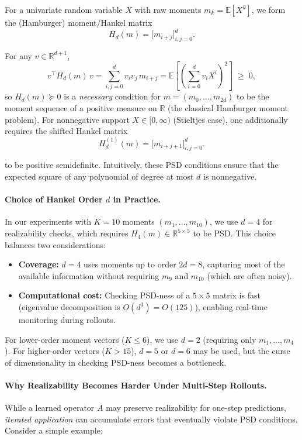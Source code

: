 \documentclass[journal, onecolumn]{IEEEtran}
\begin{document}
For a univariate random variable $X$ with raw moments \( m_k = \mathbb{E}[X^k] \), we form the (Hamburger) moment/Hankel matrix
\[
H_d(m) = \big[m_{i+j}\big]_{i,j=0}^d.
\]

For any \( v \in \mathbb{R}^{d+1} \),
\[
v^\top H_d(m)\, v
= \sum_{i,j=0}^d v_i v_j\, m_{i+j}
= \mathbb{E}\!\left[\left(\sum_{i=0}^d v_i X^i\right)^2\right]
\;\ge\; 0,
\]
so \( H_d(m) \succeq 0 \) is a \emph{necessary} condition for \( m = (m_0,\dots,m_{2d}) \) to be the moment sequence of a positive measure on \( \mathbb{R} \) (the classical Hamburger moment problem). For nonnegative support \( X \in [0,\infty) \) (Stieltjes case), one additionally requires the shifted Hankel matrix
\[
H_d^{(1)}(m) = \big[m_{i+j+1}\big]_{i,j=0}^d.
\]

to be positive semidefinite. Intuitively, these PSD conditions ensure that the expected square of any polynomial of degree at most $d$ is nonnegative.

\paragraph{Choice of Hankel Order $d$ in Practice.}
In our experiments with $K=10$ moments $(m_1, \dots, m_{10})$, we use $d=4$ for realizability checks, which requires $H_4(m) \in \mathbb{R}^{5 \times 5}$ to be PSD. This choice balances two considerations:
\begin{itemize}
    \item \textbf{Coverage:} $d=4$ uses moments up to order $2d = 8$, capturing most of the available information without requiring $m_9$ and $m_{10}$ (which are often noisy).
    \item \textbf{Computational cost:} Checking PSD-ness of a $5 \times 5$ matrix is fast (eigenvalue decomposition is $O(d^3) = O(125)$), enabling real-time monitoring during rollouts.
\end{itemize}
For lower-order moment vectors ($K \le 6$), we use $d=2$ (requiring only $m_1, \dots, m_4$). For higher-order vectors ($K > 15$), $d=5$ or $d=6$ may be used, but the curse of dimensionality in checking PSD-ness becomes a bottleneck.

\paragraph{Why Realizability Becomes Harder Under Multi-Step Rollouts.}
While a learned operator $A$ may preserve realizability for one-step predictions, \emph{iterated application} can accumulate errors that eventually violate PSD conditions. Consider a simple example:
\end{document}
